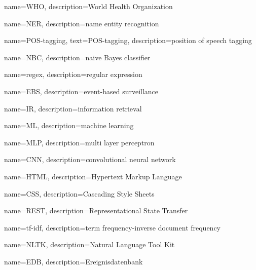 {
  name={WHO},
  description={World Health Organization}
}

{
  name={NER},
  description={name entity recognition}
}

{
  name={POS-tagging},
  text={POS-tagging},
  description={position of speech tagging}
}

{
  name={NBC},
  description={naive Bayes classifier}
}

{
  name={regex},
  description={regular expression}
}

{
  name={EBS},
  description={event-based surveillance}
}

{
  name={IR},
  description={information retrieval}
}

{
  name={ML},
  description={machine learning}
}

{
  name={MLP},
  description={multi layer perceptron}
}

{
  name={CNN},
  description={convolutional neural network}
}

{
  name={HTML},
  description={Hypertext Markup Language}
}

{
  name={CSS},
  description={Cascading Style Sheets}
}

{
  name={REST},
  description={Representational State Transfer}
}

{
  name={tf-idf},
  description={term frequency-inverse document frequency}
}

{
  name={NLTK},
  description={Natural Language Tool Kit}
}

{
  name={EDB},
  description={Ereignisdatenbank}
}

